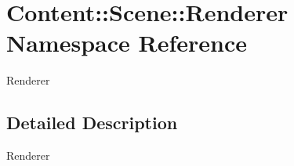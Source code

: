 \hypertarget{namespaceContent_1_1Scene_1_1Renderer}{
\section{Content::Scene::Renderer Namespace Reference}
\label{namespaceContent_1_1Scene_1_1Renderer}
}


Renderer  


\subsection{Detailed Description}
Renderer 
